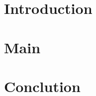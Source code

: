 \documentclass[a4paper, 12pt]{article}
\begin{document}
\begin{titlepage}


\end{titlepage}

\tableofcontents
\newpage


\section{Introduction}
\label{sec:intro}


\section{Main}
\label{sec:main}


\section{Conclution}
\label{sec:concl}



\end{document}
